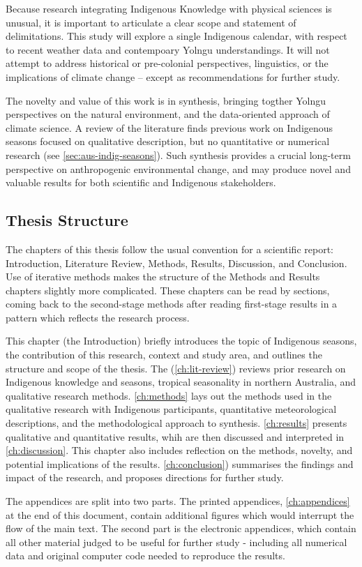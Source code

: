 Because research integrating Indigenous Knowledge with physical sciences is
unusual, it is important to articulate a clear scope and statement of delimitations.
This study will explore a single Indigenous calendar, with respect to recent weather data
and contempoary Yolngu understandings.  It will not attempt to address historical
or pre-colonial perspectives, linguistics, or the implications
of climate change -- except as recommendations for further study.

The novelty and value of this work is in synthesis, bringing
togther Yolngu perspectives on the natural environment, and the
data-oriented approach of climate science.  A review of the literature
finds previous work on Indigenous seasons focused on qualitative description, but
no quantitative or numerical research (see \cref{sec:aus-indig-seasons}).
Such synthesis provides a crucial long-term perspective on
anthropogenic environmental change, and may produce novel and valuable
results for both scientific and Indigenous stakeholders.


\clearpage
\subsection*{Thesis Structure}

The chapters of this thesis follow the usual convention for a scientific
report: Introduction, Literature Review, Methods, Results, Discussion,
and Conclusion.
%
Use of iterative methods makes the structure of the Methods and Results
chapters slightly more complicated.  These chapters can be read by sections,
coming back to the second-stage methods after reading first-stage results
in a pattern which reflects the research process.

This chapter (the Introduction) briefly introduces the topic of
Indigenous seasons, the contribution of this research, context and
study area, and outlines the structure and scope of the thesis.
The  (\cref{ch:lit-review}) reviews prior research
on Indigenous knowledge and seasons, tropical seasonality in northern
Australia, and qualitative research methods.
%
\cref{ch:methods} lays out the methods used in the qualitative research
with Indigenous participants, quantitative meteorological descriptions,
and the methodological approach to synthesis.  \cref{ch:results} presents
qualitative and quantitative results, whih are then discussed and interpreted
in \cref{ch:discussion}.  This chapter also includes reflection on the
methods, novelty, and potential implications of the results.
\cref{ch:conclusion}) summarises the findings and impact of the research,
and proposes directions for further study.

The appendices are split into two parts.  The printed appendices,
\cref{ch:appendices} at the end of this document, contain additional figures
which would interrupt the flow of the main text.  The second part
is the electronic appendices, which contain all other material judged to
be useful for further study - including all numerical data and original computer code
needed to reproduce the results.

